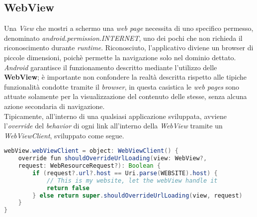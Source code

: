 \documentclass{article}
\begin{document}
\subsection*{WebView}
Una \textit{View} che mostri a schermo una \textit{web page} necessita di uno specifico permesso, denominato \textit{android.permission.INTERNET}, uno dei pochi che non richieda il riconoscimento durante \textit{runtime}. Riconosciuto, l'applicativo diviene un browser di piccole dimensioni, poichè permette la navigazione solo nel dominio dettato.\vspace*{7pt}\\
\textit{Android} garantisce il funzionamento descritto mediante l'utilizzo delle \textbf{WebView}; è importante non confondere la realtà descritta rispetto alle tipiche funzionalità condotte tramite il \textit{browser}, in questa casistica le \textit{web pages} sono attuate solamente per la visualizzazione del contenuto delle stesse, senza alcuna azione secondaria di navigazione.\vspace*{7pt}\\
Tipicamente, all'interno di una qualsiasi applicazione sviluppata, avviene l'\textit{override} del \textit{behavior} di ogni link all'interno della \textit{WebView} tramite un \textit{WebViewClient}, sviluppato come segue.
\begin{lstlisting}[language=JAVA]
webView.webViewClient = object: WebViewClient() {
    override fun shouldOverrideUrlLoading(view: WebView?, 
    request: WebResourceRequest?): Boolean {
        if (request?.url?.host == Uri.parse(WEBSITE).host) {
            // This is my website, let the webView handle it
            return false
        } else return super.shouldOverrideUrlLoading(view, request)
    }
}
\end{lstlisting}
\end{document}
